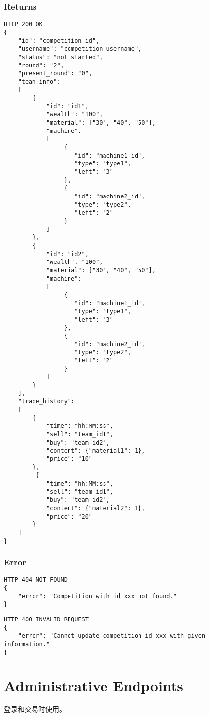 \documentclass{article}
\begin{document}
\subsubsection*{Returns}
\begin{lstlisting}
HTTP 200 OK
{
    "id": "competition_id",
    "username": "competition_username",
    "status": "not started",
    "round": "2",
    "present_round": "0",
    "team_info":
    [
        {
            "id": "id1",
            "wealth": "100",
            "material": ["30", "40", "50"],
            "machine":
            [
                 {
                    "id": "machine1_id",
                    "type": "type1",
                    "left": "3"
                 },
                 {
                    "id": "machine2_id",
                    "type": "type2",
                    "left": "2"
                 }
            ]
        },
        {
            "id": "id2",
            "wealth": "100",
            "material": ["30", "40", "50"],
            "machine":
            [
                 {
                    "id": "machine1_id",
                    "type": "type1",
                    "left": "3"
                 },
                 {
                    "id": "machine2_id",
                    "type": "type2",
                    "left": "2"
                 }
            ]
        }
    ],
    "trade_history":
    [
        {
            "time": "hh:MM:ss",
            "sell": "team_id1",
            "buy": "team_id2",
            "content": {"material1": 1},
            "price": "10"
        },
         {
            "time": "hh:MM:ss",
            "sell": "team_id1",
            "buy": "team_id2",
            "content": {"material2": 1},
            "price": "20"
        }
    ]
}

\end{lstlisting}

\subsubsection*{Error}
\begin{lstlisting}
HTTP 404 NOT FOUND
{
    "error": "Competition with id xxx not found."
}
\end{lstlisting}

\begin{lstlisting}
HTTP 400 INVALID REQUEST
{
    "error": "Cannot update competition id xxx with given information."
}
\end{lstlisting}

\section{Administrative Endpoints}
登录和交易时使用。
\end{document}

